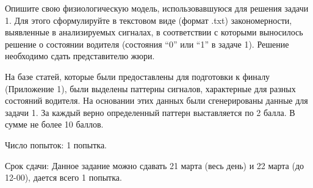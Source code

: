 
Опишите свою физиологическую модель, использовавшуюся для решения задачи 1. Для этого сформулируйте в текстовом виде  (формат .txt) закономерности, выявленные в  анализируемых сигналах, в соответствии с которыми выносилось  решение о состоянии водителя (состояния “0” или “1” в задаче 1). Решение необходимо сдать представителю жюри. 

\markSection

На базе статей, которые были предоставлены для подготовки к финалу (Приложение 1), были выделены паттерны сигналов, характерные для разных состояний водителя. На основании этих данных были сгенерированы данные для задачи 1. За каждый верно определенный паттерн выставляется по 2 балла. В сумме не более 10 баллов.

Число попыток: 1 попытка. 

Срок сдачи: Данное задание можно сдавать 21 марта (весь день) и 22 марта (до 12-00), дается всего 1 попытка. 
